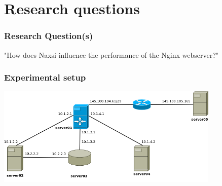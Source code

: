 \section{Research questions}

\begin{frame}
  \frametitle{Research Question(s)}
   \begin{center}
   \LARGE{"How does Naxsi influence the performance of the Nginx webserver?"}
  \end{center}
\end{frame}


\begin{frame}
  \frametitle{Experimental setup}
    \begin{center} 
      \includegraphics[width=0.80\textwidth]{../paper/images/infrastructure.png}
    \end{center}
\end{frame}
